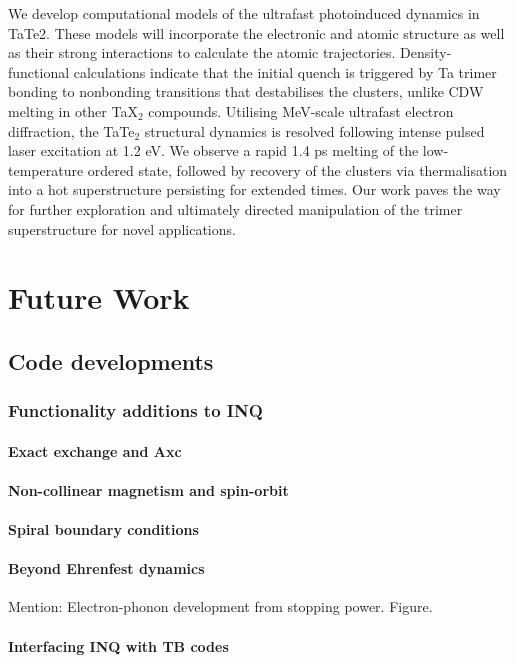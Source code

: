 We develop computational models of the ultrafast photoinduced dynamics in TaTe2. These models will incorporate the electronic and atomic structure as well as their strong interactions to calculate the atomic trajectories. Density-functional calculations indicate that the initial quench is triggered by Ta trimer bonding to nonbonding transitions that destabilises the clusters, unlike CDW melting in other TaX$_2$ compounds.
Utilising MeV-scale ultrafast electron diffraction, the TaTe$_2$ structural dynamics is resolved following intense pulsed laser excitation at 1.2 eV. We observe a rapid 1.4 ps melting of the low-temperature ordered state, followed by recovery of the clusters via thermalisation into a hot superstructure persisting for extended times.  Our work paves the way for further exploration and ultimately directed manipulation of the trimer superstructure for novel applications.



\section{Future Work}
\subsection{Code developments}
\subsubsection{Functionality additions to INQ}
\paragraph{Exact exchange and Axc}
\paragraph{Non-collinear magnetism and spin-orbit}
\paragraph{Spiral boundary conditions}

\paragraph{Beyond Ehrenfest dynamics} 
Mention: Electron-phonon development from stopping power.  Figure.

\paragraph{Interfacing INQ with TB codes}

